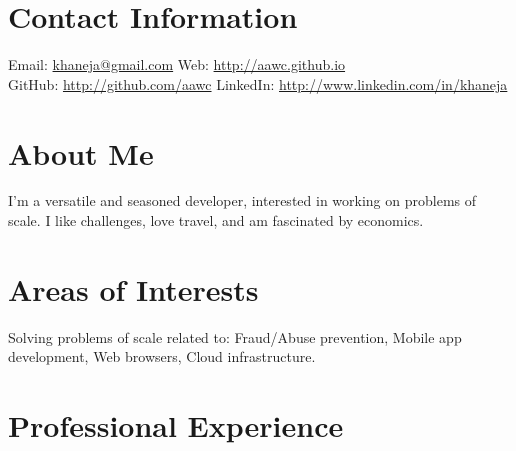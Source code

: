 \documentclass[margin,line]{resume}
\begin{document}
\begin{resume}

\section{Contact Information}

Email: \href{mailto:khaneja@gmail.com}{khaneja@gmail.com} \hfill Web: \href{http://aawc.github.io}{http://aawc.github.io}\\
GitHub: \href{http://github.com/aawc}{http://github.com/aawc} \hfill LinkedIn: \href{http://www.linkedin.com/in/khaneja}{http://www.linkedin.com/in/khaneja}

\section{About Me}
I'm a versatile and seasoned developer, interested in working on problems of scale. I like challenges, love travel, and am fascinated by economics.

\section{Areas of Interests}
Solving problems of scale related to: Fraud/Abuse prevention, Mobile app development, Web browsers, Cloud infrastructure.

\section{Professional Experience}


\end{resume}
\end{document}

